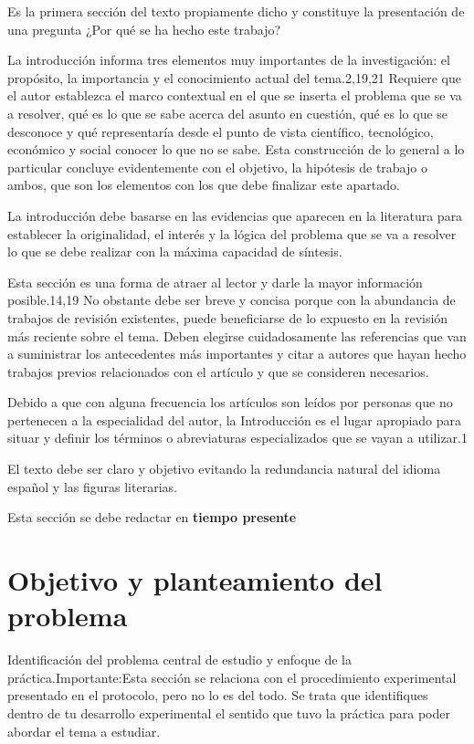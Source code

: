 \documentclass[%
 reprint,
groupedaddress,
unsortedaddress,
 amsmath,amssymb,
 aps,
superscriptaddress
]{revtex4-2}
\begin{document}
Es la primera sección del texto propiamente dicho y constituye la presentación de una 
pregunta ¿Por qué se ha hecho este trabajo?

La introducción informa tres elementos muy importantes de la investigación: el 
propósito, la importancia y el conocimiento actual del tema.2,19,21 Requiere que el 
autor establezca el marco contextual en el que se inserta el problema que se va a 
resolver, qué es lo que se sabe acerca del asunto en cuestión, qué es lo que se 
desconoce y qué representaría desde el punto de vista científico, tecnológico, económico 
y social conocer lo que no se sabe. Esta construcción de lo general a lo particular 
concluye evidentemente con el objetivo, la hipótesis de trabajo o ambos, que son los 
elementos con los que debe finalizar este apartado.

La introducción debe basarse en las evidencias que aparecen en la literatura para 
establecer la originalidad, el interés y la lógica del problema que se va a resolver lo 
que se debe realizar con la máxima capacidad de síntesis.

Esta sección es una forma de atraer al lector y darle la mayor información posible.14,19 
No obstante debe ser breve y concisa porque con la abundancia de trabajos de revisión 
existentes, puede beneficiarse de lo expuesto en la revisión más reciente sobre el tema. 
Deben elegirse cuidadosamente las referencias que van a suministrar los antecedentes más 
importantes y citar a autores que hayan hecho trabajos previos relacionados con el 
artículo y que se consideren necesarios.

Debido a que con alguna frecuencia los artículos son leídos por personas que no 
pertenecen a la especialidad del autor, la Introducción es el lugar apropiado para 
situar y definir los términos o abreviaturas especializados que se vayan a utilizar.1

El texto debe ser claro y objetivo evitando la redundancia natural del idioma español y 
las figuras literarias.

Esta sección se debe redactar en \textbf{tiempo presente}

\section{Objetivo y planteamiento del problema}

Identificación del problema central de estudio y enfoque de la práctica.Importante:Esta  
sección  se  relaciona  con  el  procedimiento  experimental  presentado  en  el 
protocolo, pero no lo es del todo. Se trata que identifiques dentro de tu desarrollo 
experimental el sentido que tuvo la práctica para poder abordar el tema a estudiar.
\end{document}
